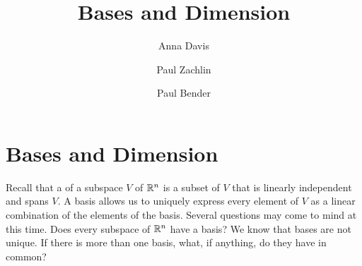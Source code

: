 \documentclass{ximera}
\author{Anna Davis \and Paul Zachlin \and Paul Bender} \title{Bases and Dimension} \license{CC-BY-NC-SA}
\begin{document}
\begin{abstract}
\end{abstract}
\maketitle

\section*{Bases and Dimension}
Recall that a  of a subspace $V$ of $\mathbb{R}^n$ is a subset of $V$ that is linearly independent and spans $V$.  A basis allows us to uniquely express every element of $V$ as a linear combination of the elements of the basis.  Several questions may come to mind at this time.  Does every subspace of $\mathbb{R}^n$ have a basis?  We know that bases are not unique.  If there is more than one basis, what, if anything, do they have in common?
\end{document}
